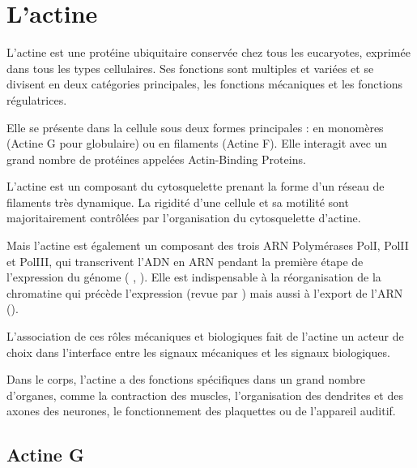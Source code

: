 %
%
%
%
%
%
\chapter{L'actine}

L'actine est une protéine ubiquitaire conservée chez tous les eucaryotes, exprimée dans tous les types cellulaires. 
Ses fonctions sont multiples et variées et se divisent en deux catégories principales, les fonctions mécaniques et les fonctions régulatrices. 

Elle se présente dans la cellule sous deux formes principales : en monomères (Actine G pour globulaire) ou en filaments (Actine F). 
Elle interagit avec un grand nombre de protéines appelées Actin-Binding Proteins. 

L'actine est un composant du cytosquelette prenant la forme d'un réseau de filaments très dynamique. La rigidité d'une cellule et sa motilité sont majoritairement contrôlées par l'organisation du cytosquelette d'actine. 

Mais l'actine est également un composant des trois ARN Polymérases PolI, PolII et PolIII, qui transcrivent l'ADN en ARN pendant la première étape de l'expression du génome ( \cite{ye_nuclear_2008}, \cite{hofmann_actin_2004} \cite{hu_role_2004}). 
Elle est indispensable à la réorganisation de la chromatine qui précède l'expression (revue par \cite{farrants_chromatin_2008}) mais aussi à l'export de l'ARN (\cite{hofmann_cofactor_2001}).  

L'association de ces rôles mécaniques et biologiques fait de l'actine un acteur de choix dans l'interface entre les signaux mécaniques et les signaux biologiques. 

Dans le corps, l'actine a des fonctions spécifiques dans un grand nombre d'organes, comme la contraction des muscles, l'organisation des dendrites et des axones des neurones, le fonctionnement des plaquettes ou de l'appareil auditif. 



\section{Actine G}

